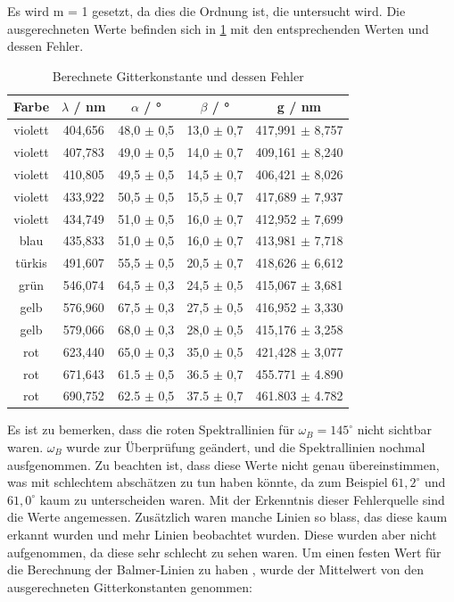 Es wird m = 1 gesetzt, da dies die Ordnung ist, die untersucht wird.
Die
 ausgerechneten Werte befinden sich in \cref{tab:gitterkonstante} mit den entsprechenden  Werten und dessen Fehler.
\begin{table}[htbp]
    \centering
    \begin{tabular}{|c|c|c|c|c|}
        Farbe & $\lambda$ / nm & $\alpha$ / ° & $\beta$ / ° & g / nm \\
        \hline 
        violett & 404,656 & 48,0 $\pm$ 0,5 & 13,0 $\pm$ 0,7 & 417,991 $\pm$ 8,757 \\
        violett & 407,783 & 49,0 $\pm$ 0,5 & 14,0 $\pm$ 0,7 & 409,161 $\pm$ 8,240 \\
        violett & 410,805 & 49,5 $\pm$ 0,5 & 14,5 $\pm$ 0,7 & 406,421 $\pm$ 8,026 \\
        violett & 433,922 & 50,5 $\pm$ 0,5 & 15,5 $\pm$ 0,7 & 417,689 $\pm$ 7,937 \\
        violett & 434,749 & 51,0 $\pm$ 0,5 & 16,0 $\pm$ 0,7 & 412,952 $\pm$ 7,699 \\
        blau & 435,833 & 51,0 $\pm$ 0,5 & 16,0 $\pm$ 0,7 & 413,981 $\pm$ 7,718 \\
        türkis & 491,607 & 55,5 $\pm$ 0,5 & 20,5 $\pm$ 0,7 & 418,626 $\pm$ 6,612 \\
        grün & 546,074 & 64,5 $\pm$ 0,3 & 24,5 $\pm$ 0,5 & 415,067 $\pm$ 3,681 \\
        gelb & 576,960 & 67,5 $\pm$ 0,3 & 27,5 $\pm$ 0,5 & 416,952 $\pm$ 3,330 \\
        gelb & 579,066 & 68,0 $\pm$ 0,3 & 28,0 $\pm$ 0,5 & 415,176 $\pm$ 3,258 \\
        rot & 623,440 & 65,0 $\pm$ 0,3 & 35,0 $\pm$ 0,5 & 421,428 $\pm$ 3,077 \\
        rot & 671,643 & 61.5 $\pm$ 0,5 & 36.5 $\pm$ 0,7 & 455.771 $\pm$ 4.890 \\
        rot & 690,752 & 62.5 $\pm$ 0,5 & 37.5 $\pm$ 0,7 & 461.803 $\pm$ 4.782 
    \end{tabular}
    \caption{Berechnete Gitterkonstante und dessen Fehler}
    \label{tab:gitterkonstante}
\end{table}
Es ist zu bemerken, dass die roten Spektrallinien für $\omega_B = 145^\circ$ nicht sichtbar waren. $\omega_B$ wurde zur Überprüfung geändert, und die Spektrallinien nochmal ausfgenommen. 
Zu beachten ist, dass diese Werte nicht genau übereinstimmen, was mit schlechtem abschätzen zu tun haben könnte, da zum Beispiel $61,2^\circ$ und $61,0^\circ$ kaum zu unterscheiden waren.
Mit der Erkenntnis dieser Fehlerquelle sind die Werte angemessen.
Zusätzlich waren manche Linien so blass, das diese kaum erkannt wurden und mehr Linien beobachtet wurden. 
Diese wurden aber nicht aufgenommen, da diese sehr schlecht zu sehen waren. 
Um einen festen Wert für die Berechnung der Balmer-Linien zu haben , wurde der Mittelwert von den ausgerechneten Gitterkonstanten genommen:

